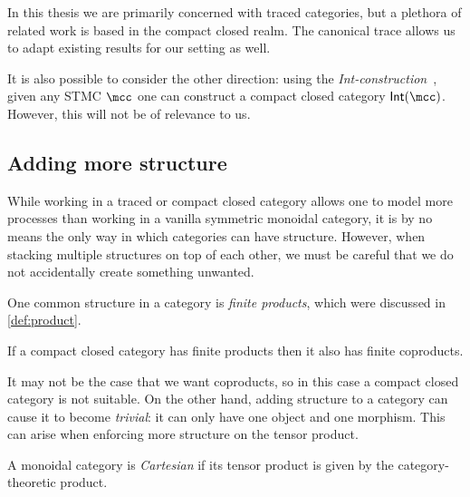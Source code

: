 In this thesis we are primarily concerned with traced categories, but a plethora
of related work is based in the compact closed realm.
The canonical trace allows us to adapt existing results for our setting as well.

\begin{remark}
    It is also possible to consider the other direction: using the
    \emph{Int-construction}~\cite{joyal1996traced}, given any STMC
    \(\mcc\) one can construct a compact closed category \(\mathsf{Int}(\mcc)\).
    However, this will not be of relevance to us.
\end{remark}

\subsection{Adding more structure}

While working in a traced or compact closed category allows one to model more
processes than working in a vanilla symmetric monoidal category, it is by no
means the only way in which categories can have structure.
However, when stacking multiple structures on top of each other, we must be
careful that we do not accidentally create something unwanted.

One common structure in a category is \emph{finite products}, which were
discussed in \cref{def:product}.

\begin{theorem}
    If a compact closed category has finite products then it also has finite
    coproducts.
\end{theorem}

It may not be the case that we want coproducts, so in this case a compact closed
category is not suitable.
On the other hand, adding structure to a category can cause it to become
\emph{trivial}: it can only have one object and one morphism.
This can arise when enforcing more structure on the tensor product.

\begin{definition}\label{def:cartesian-category}
    A monoidal category is \emph{Cartesian} if its tensor product is given by
    the category-theoretic product.
\end{definition}

